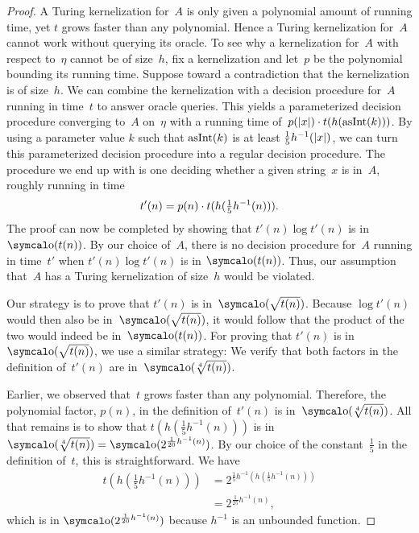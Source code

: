 \begin{proof}
  A Turing kernelization for~$A$ is only given a polynomial amount of running time, yet $t$ grows faster than any polynomial.
  Hence a Turing kernelization for~$A$ cannot work without querying its oracle.
  To see why a kernelization for~$A$ with respect to~$\eta$ cannot be of size~$h$, fix a kernelization and let~$p$ be the polynomial bounding its running time.
  Suppose toward a contradiction that the kernelization is of size~$h$.
  We can combine the kernelization with a decision procedure for~$A$ running in time~$t$ to answer oracle queries.
  This yields a parameterized decision procedure converging to~$A$ on~$\eta$ with a running time of~$p({\lvert x\rvert}) \cdot t(h(\operatorname{asInt}(k)))$.
  By using a parameter value $k$ such that $\operatorname{asInt}(k)$ is at least $\frac{1}{5} h^{-1}({\lvert x\rvert})$, we can turn this parameterized decision procedure into a regular decision procedure.
  The procedure we end up with is one deciding whether a given string~$x$ is in~$A$, roughly running in time
  \begin{equation*}
    t'(n) = p(n) \cdot t(h(\tfrac{1}{5} h^{-1}(n))).
  \end{equation*}
  The proof can now be completed by showing that $t'(n) \log t'(n)$ is in $\littleo(t(n))$.
  By our choice of~$A$, there is no decision procedure for~$A$ running in time~$t'$ when $t'(n) \log t'(n)$ is in $\littleo(t(n))$.
  Thus, our assumption that~$A$ has a Turing kernelization of size~$h$ would be violated.

  Our strategy is to prove that $t'(n)$ is in~$\littleo(\sqrt{t(n)})$.
  Because $\log t'(n)$ would then also be in~$\littleo(\sqrt{t(n)})$, it would follow that the product of the two would indeed be in~$\littleo(t(n))$.
  For proving that $t'(n)$ is in~$\littleo(\sqrt{t(n)})$, we use a similar strategy:
  We verify that both factors in the definition of~$t'(n)$ are in~$\littleo(\sqrt[4]{t(n)})$.

  Earlier, we observed that~$t$ grows faster than any polynomial.
  Therefore, the polynomial factor, $p(n)$, in the definition of~$t'(n)$ is in~$\littleo(\sqrt[4]{t(n)})$.
  All that remains is to show that $t(h(\frac{1}{5} h^{-1}(n)))$ is in $\littleo(\sqrt[4]{t(n)}) = \littleo(2^{\frac{1}{20} h^{-1}(n)})$.
  By our choice of the constant~$\frac{1}{5}$ in the definition of~$t$, this is straightforward.
  We have
  \begin{align*}
    t(h(\tfrac{1}{5} h^{-1}(n))) &= 2^{\frac{1}{5} h^{-1}(h(\frac{1}{5} h^{-1}(n)))} \\
      &= 2^{\frac{1}{25} h^{-1}(n)},
  \end{align*}
  which is in $\littleo(2^{\frac{1}{20} h^{-1}(n)})$ because $h^{-1}$ is an unbounded function.
\end{proof}

